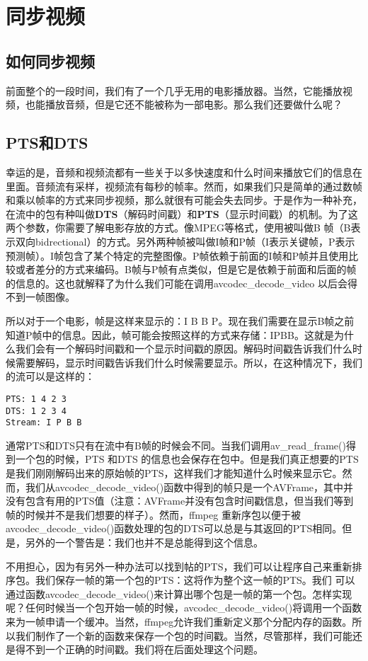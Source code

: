 ﻿\chapter{同步视频}
\label{ch5}
\section{如何同步视频}
前面整个的一段时间，我们有了一个几乎无用的电影播放器。当然，它能播放视频，也能播放音频，但是它还不能被称为一部电影。那么我们还要做什么呢？
\section{PTS和DTS}
幸运的是，音频和视频流都有一些关于以多快速度和什么时间来播放它们的信息在里面。音频流有采样，视频流有每秒的帧率。然而，如果我们只是简单的通过数帧和乘以帧率的方式来同步视频，那么就很有可能会失去同步。于是作为一种补充，在流中的包有种叫做\textbf{DTS}（解码时间戳）和\textbf{PTS}（显示时间戳）的机制。为了这两个参数，你需要了解电影存放的方式。像MPEG等格式，使用被叫做B 帧（B表示双向bidrectional）的方式。另外两种帧被叫做I帧和P帧（I表示关键帧，P表示预测帧）。I帧包含了某个特定的完整图像。P帧依赖于前面的I帧和P帧并且使用比较或者差分的方式来编码。B帧与P帧有点类似，但是它是依赖于前面和后面的帧的信息的。这也就解释了为什么我们可能在调用avcodec_decode_video 以后会得不到一帧图像。

所以对于一个电影，帧是这样来显示的：I B B P。现在我们需要在显示B帧之前知道P帧中的信息。因此，帧可能会按照这样的方式来存储：IPBB。这就是为什么我们会有一个解码时间戳和一个显示时间戳的原因。解码时间戳告诉我们什么时候需要解码，显示时间戳告诉我们什么时候需要显示。所以，在这种情况下，我们的流可以是这样的：

\begin{verbatim}
PTS: 1 4 2 3
DTS: 1 2 3 4
Stream: I P B B
\end{verbatim}

通常PTS和DTS只有在流中有B帧的时候会不同。当我们调用av_read_frame()得到一个包的时候，PTS 和DTS 的信息也会保存在包中。但是我们真正想要的PTS 是我们刚刚解码出来的原始帧的PTS，这样我们才能知道什么时候来显示它。然而，我们从avcodec_decode_video()函数中得到的帧只是一个AVFrame，其中并 没有包含有用的PTS值（注意：AVFrame并没有包含时间戳信息，但当我们等到帧的时候并不是我们想要的样子）。然而，ffmpeg 重新序包以便于被avcodec_decode_video()函数处理的包的DTS可以总是与其返回的PTS相同。但是，另外的一个警告是：我们也并不是总能得到这个信息。

不用担心，因为有另外一种办法可以找到帖的PTS，我们可以让程序自己来重新排序包。我们保存一帧的第一个包的PTS：这将作为整个这一帧的PTS。我们 可以通过函数avcodec_decode_video()来计算出哪个包是一帧的第一个包。怎样实现呢？任何时候当一个包开始一帧的时候，avcodec_decode_video()将调用一个函数来为一帧申请一个缓冲。当然，ffmpeg允许我们重新定义那个分配内存的函数。所以我们制作了一个新的函数来保存一个包的时间戳。当然，尽管那样，我们可能还是得不到一个正确的时间戳。我们将在后面处理这个问题。

